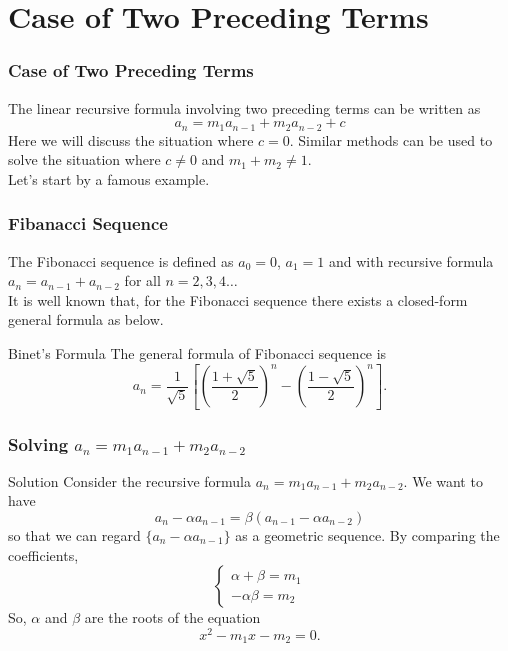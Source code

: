 \documentclass{beamer}
\theoremstyle{definition}
\theoremstyle{remark}
\begin{document}
\section{Case of Two Preceding Terms}
\begin{frame}
  \frametitle{Case of Two Preceding Terms}
  The linear recursive formula involving two preceding
  terms can be written as \[
    a_n = m_1 a_{n-1} + m_2 a_{n-2} + c
  \]
  Here we will discuss the situation where $c = 0$. 
  Similar methods can be used to solve the situation
  where $c \neq 0$ and $m_1 + m_2 \neq 1$. 
  \\
  Let's start by a famous example.
\end{frame}
\begin{frame}
  \frametitle{Fibanacci Sequence}
  The Fibonacci sequence is defined as $a_0 = 0$, $a_1 = 1$ and with 
  recursive formula $a_n = a_{n-1} + a_{n-2}$ for all $n=2,3,4\dots$ 
  \\
  It is well known that, for the Fibonacci sequence there 
  exists a closed-form general formula as below. 
  \\
  \begin{block}{Binet's Formula}
     The general formula of Fibonacci sequence is
     \[
       a_n = \frac{1}{\sqrt{5}} \left[\left(\frac{1+\sqrt{5}}{2}\right)^n
       -\left(\frac{1-\sqrt{5}}{2}\right)^n\right].
     \]
  \end{block}
\end{frame}
\begin{frame}
  \frametitle{Solving $a_n = m_1 a_{n-1} + m_2 a_{n-2}$}
  \begin{block}{Solution}
    Consider the recursive formula $a_n = m_1 a_{n-1} + m_2 a_{n-2}$. We want 
    to have \[
      a_n - \alpha a_{n-1} = \beta (a_{n-1} - \alpha a_{n-2})
    \]
    so that we can regard $\{a_n - \alpha a_{n-1}\}$ as a 
    geometric sequence. 
    By comparing the coefficients,
    \[
      \begin{cases}
         \alpha + \beta = m_1 \\
         -\alpha\beta = m_2
      \end{cases}
    \]
    So, $\alpha$ and $\beta$ are the roots of the equation \[
      x^2 - m_1 x -m_2 = 0. 
    \] 
  \end{block}
\end{frame}
\end{document}
